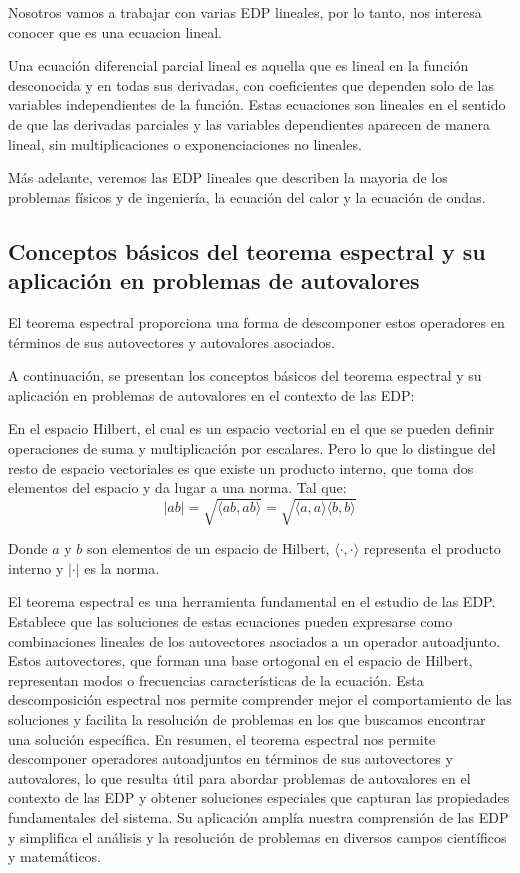 \documentclass{article}
\begin{document}
    Nosotros vamos a trabajar con varias EDP lineales, por lo tanto, nos interesa conocer que es una ecuacion lineal.
    
    Una ecuación diferencial parcial lineal es aquella que es lineal en la función desconocida y en todas sus derivadas, con coeficientes que dependen solo de las variables independientes de la función. Estas ecuaciones son lineales en el sentido de que las derivadas parciales y las variables dependientes aparecen de manera lineal, sin multiplicaciones o exponenciaciones no lineales. 

    Más adelante, veremos las EDP lineales que describen la mayoria de los problemas físicos y de ingeniería, la ecuación del calor y la ecuación de ondas.
    \subsection{Conceptos básicos del teorema espectral y su aplicación en problemas de autovalores}

    El teorema espectral proporciona una forma de descomponer estos operadores en términos de sus autovectores y autovalores asociados.

    A continuación, se presentan los conceptos básicos del teorema espectral y su aplicación en problemas de autovalores en el contexto de las EDP:

    En el espacio Hilbert, el cual es un espacio vectorial en el que se pueden definir operaciones de suma y multiplicación por escalares. Pero lo que lo distingue del resto de espacio vectoriales es que existe un producto interno, que toma dos elementos del espacio y da lugar a una norma. Tal que:
    \begin{equation}
        |ab| = \sqrt{\langle ab, ab \rangle} = \sqrt{\langle a,a \rangle \langle b,b \rangle}
        \end{equation}
        
        Donde $a$ y $b$ son elementos de un espacio de Hilbert, $\langle \cdot, \cdot \rangle$ representa el producto interno y $| \cdot |$ es la norma.
    

    El teorema espectral es una herramienta fundamental en el estudio de las EDP. Establece que las soluciones de estas ecuaciones pueden expresarse como combinaciones lineales de los autovectores asociados a un operador autoadjunto. Estos autovectores, que forman una base ortogonal en el espacio de Hilbert, representan modos o frecuencias características de la ecuación. Esta descomposición espectral nos permite comprender mejor el comportamiento de las soluciones y facilita la resolución de problemas en los que buscamos encontrar una solución específica. En resumen, el teorema espectral nos permite descomponer operadores autoadjuntos en términos de sus autovectores y autovalores, lo que resulta útil para abordar problemas de autovalores en el contexto de las EDP y obtener soluciones especiales que capturan las propiedades fundamentales del sistema. Su aplicación amplía nuestra comprensión de las EDP y simplifica el análisis y la resolución de problemas en diversos campos científicos y matemáticos.
\end{document}
